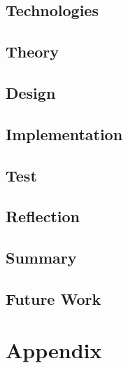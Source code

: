




 
\tableofcontents








\chapter{Technologies}



\chapter{Theory}


\chapter{Design}

\chapter{Implementation}

\chapter{Test}




\chapter{Reflection}


\chapter{Summary}


\chapter{Future Work}


\printbibliography

\part{Appendix}
\appendix



 
